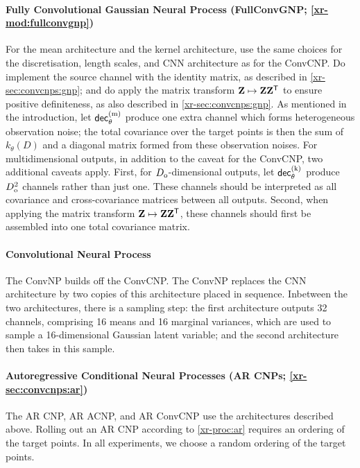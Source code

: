 \documentclass[12pt]{report}
\newcommand{\xrprefix}[1]{xr-#1}
\begin{document}
\paragraph{Fully Convolutional Gaussian Neural Process (FullConvGNP; \cref{\xrprefix{mod:fullconvgnp}})}
For the mean architecture and the kernel architecture, use the same choices for the discretisation, length scales, and CNN architecture as for the ConvCNP.
Do implement the source channel with the identity matrix, as described in \cref{\xrprefix{sec:convcnps:gnp}};
and do apply the matrix transform $\mZ \mapsto \mZ \mZ^\T$ to ensure positive definiteness, as also described in \cref{\xrprefix{sec:convcnps:gnp}}.
As mentioned in the introduction, let $\dec\us{(m)}_\theta$ produce one extra channel which forms heterogeneous observation noise;
the total covariance over the target points is then the sum of $k_\theta(D)$ and a diagonal matrix formed from these observation noises.
For multidimensional outputs, in addition to the caveat for the ConvCNP, two additional caveats apply.
First, for $D\ss{o}$-dimensional outputs, let $\dec\us{(k)}_\theta$ produce $D\ss{o}^2$ channels rather than just one. 
These channels should be interpreted as all covariance and cross-covariance matrices between all outputs.
Second, when applying the matrix transform $\mZ \mapsto \mZ \mZ^\T$, these channels should first be assembled into one total covariance matrix.

\paragraph{Convolutional Neural Process \parencite[ConvNP;][]{Foong:2020:Meta-Learning_Stationary_Stochastic_Process_Prediction}}
The ConvNP builds off the ConvCNP.
The ConvNP replaces the CNN architecture by two copies of this architecture placed in sequence.
Inbetween the two architectures, there is a sampling step:
the first architecture outputs 32 channels, comprising 16 means and 16 marginal variances, which are used to sample a 16-dimensional Gaussian latent variable;
and the second architecture then takes in this sample.

\paragraph{Autoregressive Conditional Neural Processes (AR CNPs; \cref{\xrprefix{sec:convcnps:ar}})}
The AR CNP, AR ACNP, and AR ConvCNP use the architectures described above.
Rolling out an AR CNP according to \cref{\xrprefix{proc:ar}} requires an ordering of the target points.
In all experiments, we choose a random ordering of the target points.
\end{document}

